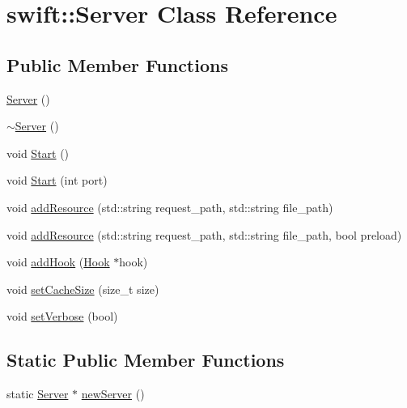 \hypertarget{classswift_1_1_server}{\section{swift\-:\-:Server Class Reference}
\label{classswift_1_1_server}
}
\subsection*{Public Member Functions}
\begin{DoxyCompactItemize}
\item 
\hyperlink{classswift_1_1_server_a0322af4ef5852cd53e37dc661c46637b}{Server} ()
\item 
\hyperlink{classswift_1_1_server_aef7faff951fc4b6f82450fd93f7c06c5}{$\sim$\-Server} ()
\item 
void \hyperlink{classswift_1_1_server_aff8c9f94b8d827131b0b80b6607ea01f}{Start} ()
\item 
void \hyperlink{classswift_1_1_server_a9778a55fbf0118a856af782d21562019}{Start} (int port)
\item 
void \hyperlink{classswift_1_1_server_ae4354d31df0a668c8de089da2faf1ab2}{add\-Resource} (std\-::string request\-\_\-path, std\-::string file\-\_\-path)
\item 
void \hyperlink{classswift_1_1_server_ac07ca21b3203f486ae6372d7accfabce}{add\-Resource} (std\-::string request\-\_\-path, std\-::string file\-\_\-path, bool preload)
\item 
void \hyperlink{classswift_1_1_server_adad7a0c0bf0431015333228969957fc4}{add\-Hook} (\hyperlink{classswift_1_1_hook}{Hook} $\ast$hook)
\item 
void \hyperlink{classswift_1_1_server_ad94cc232553cbbddb57463c343456e18}{set\-Cache\-Size} (size\-\_\-t size)
\item 
void \hyperlink{classswift_1_1_server_a689cb1da20caa7c8a5ac733a4259f87b}{set\-Verbose} (bool)
\end{DoxyCompactItemize}
\subsection*{Static Public Member Functions}
\begin{DoxyCompactItemize}
\item 
static \hyperlink{classswift_1_1_server}{Server} $\ast$ \hyperlink{classswift_1_1_server_a305f7482f2229d522a08f1d92b36dea2}{new\-Server} ()
\end{DoxyCompactItemize}


